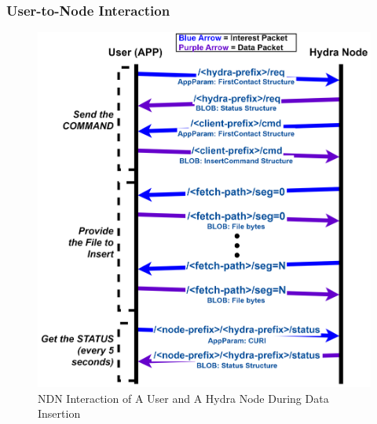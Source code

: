 \subsubsection{User-to-Node Interaction}
\begin{figure}[!ht]
    \centering
    \includegraphics[width=\columnwidth]{visuals/insert-usr.png}
    \caption{NDN Interaction of A User and A Hydra Node During Data Insertion}
    \label{fig:insert-usr}
\end{figure}

